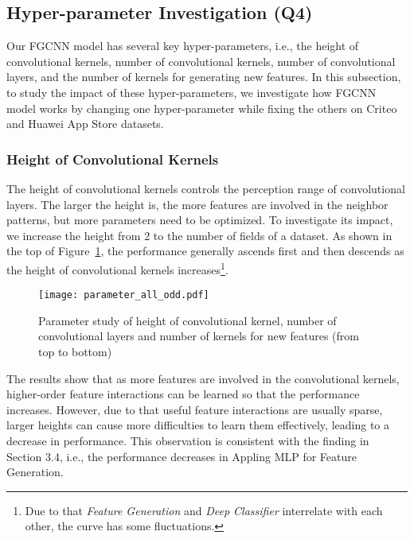 \subsection{Hyper-parameter Investigation (Q4)}

Our FGCNN model has several key hyper-parameters, i.e., the height of convolutional kernels, number of convolutional kernels, number of convolutional layers, and the number of kernels for generating new features. In this subsection, to study the impact of these hyper-parameters, we investigate how FGCNN model works by changing one hyper-parameter while fixing the others on Criteo and Huawei App Store datasets.

\subsubsection{Height of Convolutional Kernels}
 
The height of convolutional kernels controls the perception range of convolutional layers. The larger the height is, the more features are involved in the neighbor patterns, but more parameters need to be optimized. To investigate its impact, we increase the height from 2 to the number of fields of a dataset. As shown in the top of Figure~\ref{fig:param_all},
the performance generally ascends first and then descends as the height of convolutional kernels increases\footnote{Due to that \textit{Feature Generation} and \textit{Deep Classifier} interrelate with each other, the curve has some fluctuations.}.
\begin{figure}[t]
 \centering
 \texttt{[image: parameter\_all\_odd.pdf]}
 \vspace{-4ex}
 \caption{Parameter study of height of convolutional kernel, number of convolutional layers and number of  kernels for new features (from top to bottom)}
 \vspace{-3ex}
 \label{fig:param_all}
\end{figure}

The results show that as more features are involved in the convolutional kernels, higher-order feature interactions can be learned so that the performance increases. However, due to that useful feature interactions are usually sparse, larger heights can cause more difficulties to learn them effectively, leading to a decrease in performance. This observation is consistent with the finding in Section 3.4, i.e., the performance decreases in Appling MLP for Feature Generation.


